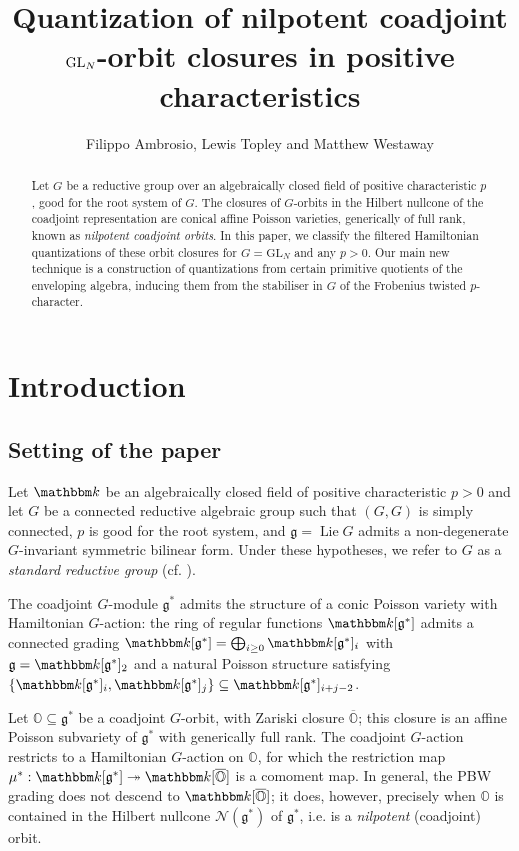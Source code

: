 \documentclass[twoside,12pt,reqno]{amsart}
\title{\boldmath Quantization of nilpotent coadjoint $\GL_N$-orbit closures in positive characteristics}
\author{Filippo Ambrosio, Lewis Topley and Matthew Westaway}
\theoremstyle{remark}
\numberwithin{equation}{section}
\def\k{{\mathbbm k}}
\def\Lie{\operatorname{Lie}}
\def\O{{\mathbb O}}
\def\cO{{\overline{\mathbb O}}}
\def\GL{\mathrm{GL}}
\def\g{{\mathfrak g}}
\newcommand{\Nc}{\mathcal{N}}
\begin{document}
	
	\maketitle

    \begin{abstract}
    Let $G$ be a reductive group over an algebraically closed field of positive characteristic $p$, good for the root system of $G$. The closures of $G$-orbits in the Hilbert nullcone of the coadjoint representation are conical affine Poisson varieties, generically of full rank, known as {\em nilpotent coadjoint orbits}. In this paper, we classify the filtered Hamiltonian quantizations of these orbit closures for $G = \GL_N$ and any $p > 0$. Our main new technique is a construction of quantizations from certain primitive quotients of the enveloping algebra, inducing them from the stabiliser in $G$ of the Frobenius twisted $p$-character.
    \end{abstract}



 \section{Introduction}

 \subsection{Setting of the paper}
 \label{ss:statement}

 Let $\k$ be an algebraically closed field of positive characteristic $p>0$ and let $G$ be a connected reductive algebraic group such that $(G,G)$ is simply connected, $p$ is good for the root system, and $\g = \Lie G$ admits a non-degenerate $G$-invariant symmetric bilinear form. Under these hypotheses, we refer to $G$ as a {\it standard reductive group} (cf. \cite[]{JaLA}). 

  The coadjoint $G$-module $\g^*$ admits the structure of a conic Poisson variety with Hamiltonian $G$-action: the ring of regular functions $\k[\g^*]$ admits a connected grading $\k[\g^*] = \bigoplus_{i \ge 0} \k[\g^*]_i$ with $\g = \k[\g^*]_2$ and a natural Poisson structure satisfying $\{\k[\g^*]_i, \k[\g^*]_j\} \subseteq \k[\g^*]_{i+j-2}$.


 Let $\O\subseteq \g^*$ be a coadjoint $G$-orbit, with Zariski closure $\cO$; this closure is an affine Poisson subvariety of $\g^*$ with generically full rank. The coadjoint $G$-action restricts to a Hamiltonian $G$-action on $\O$, for which the restriction map $\mu^*:\k[\g^*]\twoheadrightarrow \k[\cO]$ is a comoment map. In general, the PBW grading does not descend to $\k[\cO]$; it does, however, precisely when $\O$ is contained in the Hilbert nullcone $\Nc(\g^*)$ of $\g^*$, i.e. is a {\em nilpotent} (coadjoint) orbit. 
 
\end{document}
